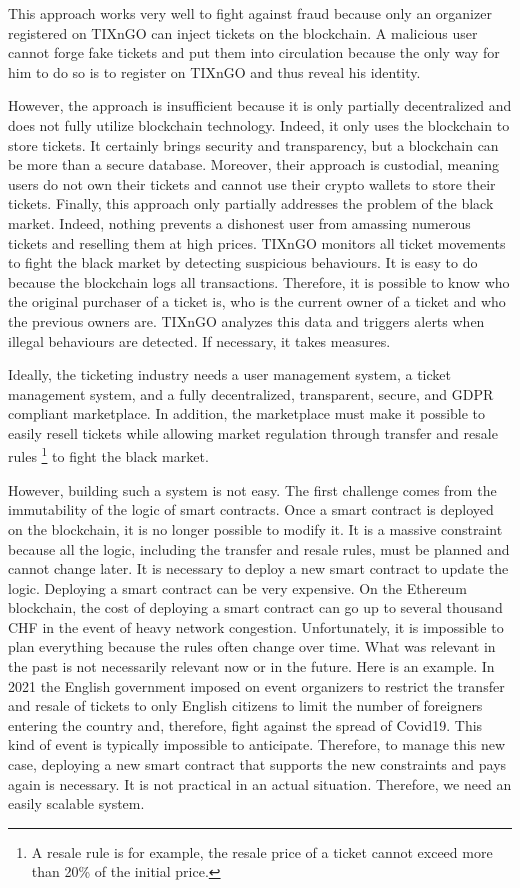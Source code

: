 \documentclass[a4paper,11pt,oneside]{report}
\begin{document}
This approach works very well to fight against fraud because only an organizer registered on TIXnGO can inject tickets on the blockchain. A malicious user cannot forge fake tickets and put them into circulation because the only way for him to do so is to register on TIXnGO and thus reveal his identity.

However, the approach is insufficient because it is only partially decentralized and does not fully utilize blockchain technology. Indeed, it only uses the blockchain to store tickets. It certainly brings security and transparency, but a blockchain can be more than a secure database. Moreover, their approach is custodial, meaning users do not own their tickets and cannot use their crypto wallets to store their tickets. Finally, this approach only partially addresses the problem of the black market. Indeed, nothing prevents a dishonest user from amassing numerous tickets and reselling them at high prices. TIXnGO monitors all ticket movements to fight the black market by detecting suspicious behaviours. It is easy to do because the blockchain logs all transactions. Therefore, it is possible to know who the original purchaser of a ticket is, who is the current owner of a ticket and who the previous owners are. TIXnGO analyzes this data and triggers alerts when illegal behaviours are detected. If necessary, it takes measures.

Ideally, the ticketing industry needs a user management system, a ticket management system, and a fully decentralized, transparent, secure, and GDPR compliant marketplace. In addition, the marketplace must make it possible to easily resell tickets while allowing market regulation through transfer and resale rules \footnote{A resale rule is for example, the resale price of a ticket cannot exceed more than 20\% of the initial price.} to fight the black market.

However, building such a system is not easy. The first challenge comes from the immutability of the logic of smart contracts. Once a smart contract is deployed on the blockchain, it is no longer possible to modify it. It is a massive constraint because all the logic, including the transfer and resale rules, must be planned and cannot change later. It is necessary to deploy a new smart contract to update the logic. Deploying a smart contract can be very expensive. On the Ethereum blockchain, the cost of deploying a smart contract can go up to several thousand CHF in the event of heavy network congestion. Unfortunately, it is impossible to plan everything because the rules often change over time. What was relevant in the past is not necessarily relevant now or in the future. Here is an example. In 2021 the English government imposed on event organizers to restrict the transfer and resale of tickets to only English citizens to limit the number of foreigners entering the country and, therefore, fight against the spread of Covid19. This kind of event is typically impossible to anticipate. Therefore, to manage this new case, deploying a new smart contract that supports the new constraints and pays again is necessary. It is not practical in an actual situation. Therefore, we need an easily scalable system.
\end{document}
